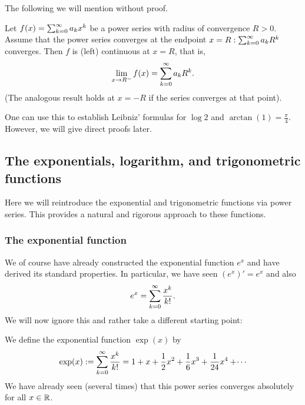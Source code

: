\documentclass[10pt, a4paper]{article}
\begin{document}
The following we will mention without proof.
\begin{theorem}\label{pre:analy:thm:abellimthm}
    Let $f(x) = \sum_{k = 0}^{\infty} a_kx ^ k$ be a power series with radius of convergence $R > 0$.
    Assume that the power series converges at the endpoint $x = R: \sum_{k = 0}^{\infty} a_kR ^ k$ converges.
    Then $f$ is
    (left)
    continuous at $x = R$,
    that is,
    \[
    \lim_{x \rightarrow R ^ {-}}f(x) = \sum_{k = 0}^{\infty} a_kR ^ k.
    \]
    (The analogous result holds at $x = -R$ if the series converges at that point).
\end{theorem}

One can use this to establish Leibniz' formulas for $\log{2}$ and $\arctan(1) = \frac{\pi}{4}$.
However,
we will give direct proofs later.

\subsection{The exponentials, logarithm, and trigonometric functions}
Here we will reintroduce the exponential and trigonometric functions via power series.
This provides a natural and rigorous approach to these functions.

\subsubsection{The exponential function}
We of course have already constructed the exponential function $e ^ x$ and have derived its standard properties.
In particular,
we have seen $(e ^ x)' = e ^ x$ and also
\[
e ^ x = \sum_{k = 0}^{\infty}\frac{x ^ k}{k!}.
\]
We will now ignore this and rather take a different starting point:
\begin{definition}
    We define the exponential function $\exp(x)$ by
    \[
    \exp(x) := \sum_{k = 0}^{\infty}\frac{x ^ k}{k!} = 1 + x + \frac{1}{2}x ^ 2 + \frac{1}{6}x ^ 3 + \frac{1}{24}x ^ 4 + \dotsi
    \]
    We have already seen
    (several times)
    that this power series converges absolutely for all $x \in \mathbb{R}$.
\end{definition}
\end{document}
